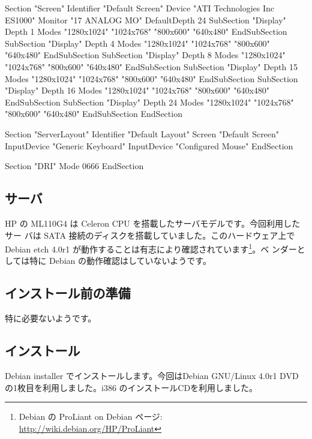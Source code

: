 \documentclass[mingoth,a4paper]{jsarticle}
\begin{document}
\begin{commandline}
Section "Screen"
	Identifier	"Default Screen"
	Device		"ATI Technologies Inc ES1000"
	Monitor		"17 ANALOG MO"
	DefaultDepth	24
	SubSection "Display"
		Depth		1
		Modes		"1280x1024" "1024x768" "800x600" "640x480"
	EndSubSection
	SubSection "Display"
		Depth		4
		Modes		"1280x1024" "1024x768" "800x600" "640x480"
	EndSubSection
	SubSection "Display"
		Depth		8
		Modes		"1280x1024" "1024x768" "800x600" "640x480"
	EndSubSection
	SubSection "Display"
		Depth		15
		Modes		"1280x1024" "1024x768" "800x600" "640x480"
	EndSubSection
	SubSection "Display"
		Depth		16
		Modes		"1280x1024" "1024x768" "800x600" "640x480"
	EndSubSection
	SubSection "Display"
		Depth		24
		Modes		"1280x1024" "1024x768" "800x600" "640x480"
	EndSubSection
EndSection

Section "ServerLayout"
	Identifier	"Default Layout"
	Screen		"Default Screen"
	InputDevice	"Generic Keyboard"
	InputDevice	"Configured Mouse"
EndSection

Section "DRI"
	Mode	0666
EndSection

\end{commandline}


\label{ML110G4}

\subsection{サーバ}

HP の ML110G4 は Celeron CPU を搭載したサーバモデルです。今回利用したサー
バは SATA 接続のディスクを搭載していました。このハードウェア上でDebian
etch 4.0r1 が動作することは有志により確認されています\footnote{Debian の
ProLiant on Debian ページ: \url{http://wiki.debian.org/HP/ProLiant}}。ベ
ンダーとしては特に Debian の動作確認はしていないようです。

\subsection{インストール前の準備}

特に必要ないようです。

\subsection{インストール}

Debian installer でインストールします。今回はDebian GNU/Linux 4.0r1 DVD 
の1枚目を利用しました。i386 のインストールCDを利用しました。
\end{document}
